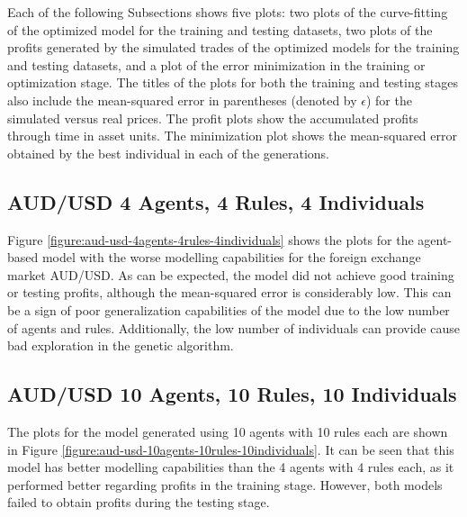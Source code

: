 Each of the following Subsections shows five plots: two plots of the
curve-fitting of the optimized model for the training and testing datasets, two
plots of the profits generated by the simulated trades of the optimized models
for the training and testing datasets, and a plot of the error minimization in
the training or optimization stage. The titles of the plots for both the
training and testing stages also include the mean-squared error in parentheses
(denoted by $\epsilon$) for the simulated versus real prices. The profit plots
show the accumulated profits through time in asset units. The minimization plot
shows the mean-squared error obtained by the best individual in each of the
generations.

\newpage

\subsection{AUD/USD 4 Agents, 4 Rules, 4 Individuals}
\label{results:forecast-aud-usd-4agents-4rules-4individuals}

Figure \ref{figure:aud-usd-4agents-4rules-4individuals} shows the plots for the
agent-based model with the worse modelling capabilities for the foreign exchange
market AUD/USD. As can be expected, the model did not achieve good training or
testing profits, although the mean-squared error is considerably low. This can
be a sign of poor generalization capabilities of the model due to the low number
of agents and rules. Additionally, the low number of individuals can provide
cause bad exploration in the genetic algorithm.



\newpage

\subsection{AUD/USD 10 Agents, 10 Rules, 10 Individuals}
\label{results:forecast-aud-usd-10agents-10rules-10individuals}

The plots for the model generated using 10 agents with 10 rules each are shown
in Figure \ref{figure:aud-usd-10agents-10rules-10individuals}. It can be seen
that this model has better modelling capabilities than the 4 agents with 4 rules
each, as it performed better regarding profits in the training stage. However,
both models failed to obtain profits during the testing stage.



\newpage

